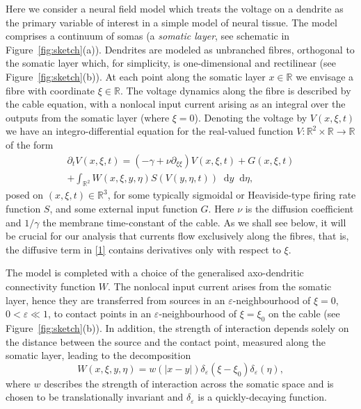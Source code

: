 \documentclass[a4paper,final]{siamart190516}
\newcommand{\Rb}{\mathbb{R}}
\newcommand{\diff}{\mathop{}\!\mathrm{d}}
\newcommand{\ep}{\varepsilon}
\begin{document}
Here we consider a neural field model which treats the voltage on a dendrite as the
primary variable of interest in a simple model of neural tissue. The model comprises
a continuum of somas (a \emph{somatic layer}, see schematic in
Figure~\ref{fig:sketch}(a)). Dendrites are modeled as unbranched fibres,
orthogonal to the somatic layer which, for simplicity, is one-dimensional and
rectilinear (see Figure~\ref{fig:sketch}(b)). At each point along the somatic layer
$x \in \Rb$ we envisage a fibre with coordinate $\xi \in \Rb$. The voltage dynamics
along the fibre is described by the cable equation, with a nonlocal input current
arising as
an integral
over the outputs from the somatic layer (where $\xi=0$). Denoting the voltage by
$V(x,\xi,t)$ we have an integro-differential equation for the
real-valued function $V:  \Rb^2 \times \Rb  \rightarrow \Rb$ of the form
  \begin{multline} \label{1}
  \partial_t V(x,\xi, t) = (-\gamma + \nu \partial_{\xi \xi}) V(x,\xi,t)
                        + G(x,\xi,t)
			\\
  + \int_{\Rb^2} W(x,\xi,y,\eta) 
                        S(V(y,\eta,t))\diff y \diff \eta ,
  \end{multline}
posed on $(x,\xi,t) \in \Rb^3$, for some typically sigmoidal or
Heaviside-type  firing rate function $S$, and some external input function $G$. Here
$\nu$ is the diffusion coefficient and $1/\gamma$ the membrane time-constant of the
cable. As we shall see below, it will be crucial for our analysis that currents flow
exclusively along the fibres, that is, the diffusive term in \eqref{1} contains
derivatives only with respect to $\xi$.

The model is completed with a choice of the generalised axo-dendritic connectivity
function $W$. The nonlocal input current arises from the somatic layer, hence they
are transferred from sources in an $\ep$-neighbourhood of $\xi = 0$, $0 < \ep \ll 1$, to 
contact points in an $\ep$-neighbourhood of $\xi=\xi_0$ on the cable (see
Figure~\ref{fig:sketch}(b)). In addition, the strength of interaction depends
solely on the distance between the source and the contact point, measured along the
somatic layer, leading to the decomposition
\begin{equation}\label{eq:kernel}
  W(x,\xi,y, \eta)=    w(|x-y|)\delta_\ep(\xi-\xi_0) \delta_\ep(\eta),
\end{equation}
where $w$ describes the strength of interaction across the somatic space and is
chosen to be translationally invariant and $\delta_\ep$ is a quickly-decaying
function. 
\end{document}

